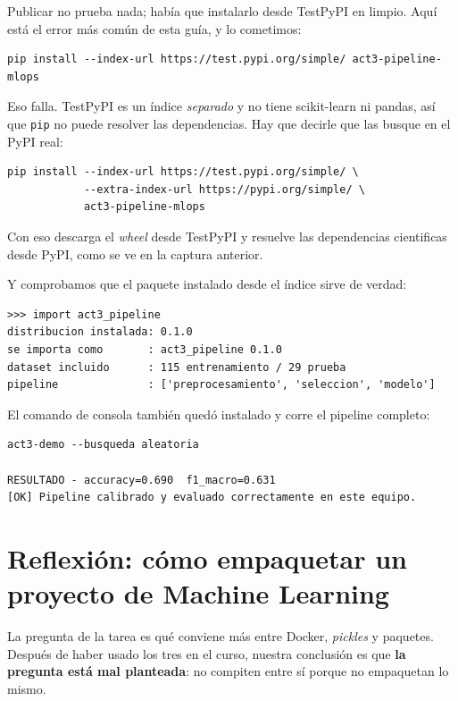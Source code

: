 \documentclass[12pt,a4paper]{article}
\begin{document}
Publicar no prueba nada; había que instalarlo desde TestPyPI en limpio. Aquí está el error más
común de esta guía, y lo cometimos:

\begin{verbatim}
pip install --index-url https://test.pypi.org/simple/ act3-pipeline-mlops
\end{verbatim}

Eso falla. TestPyPI es un índice \emph{separado} y no tiene scikit-learn ni pandas, así que
\texttt{pip} no puede resolver las dependencias. Hay que decirle que las busque en el PyPI real:

\begin{verbatim}
pip install --index-url https://test.pypi.org/simple/ \
            --extra-index-url https://pypi.org/simple/ \
            act3-pipeline-mlops
\end{verbatim}

Con eso descarga el \emph{wheel} desde TestPyPI y resuelve las dependencias cientificas desde
PyPI, como se ve en la captura anterior.

Y comprobamos que el paquete instalado desde el índice sirve de verdad:

\begin{verbatim}
>>> import act3_pipeline
distribucion instalada: 0.1.0
se importa como       : act3_pipeline 0.1.0
dataset incluido      : 115 entrenamiento / 29 prueba
pipeline              : ['preprocesamiento', 'seleccion', 'modelo']
\end{verbatim}

El comando de consola también quedó instalado y corre el pipeline completo:

\begin{verbatim}
act3-demo --busqueda aleatoria

RESULTADO - accuracy=0.690  f1_macro=0.631
[OK] Pipeline calibrado y evaluado correctamente en este equipo.
\end{verbatim}

\section{Reflexión: cómo empaquetar un proyecto de Machine Learning}

La pregunta de la tarea es qué conviene más entre Docker, \emph{pickles} y paquetes. Después de
haber usado los tres en el curso, nuestra conclusión es que \textbf{la pregunta está mal
planteada}: no compiten entre sí porque no empaquetan lo mismo.
\end{document}
